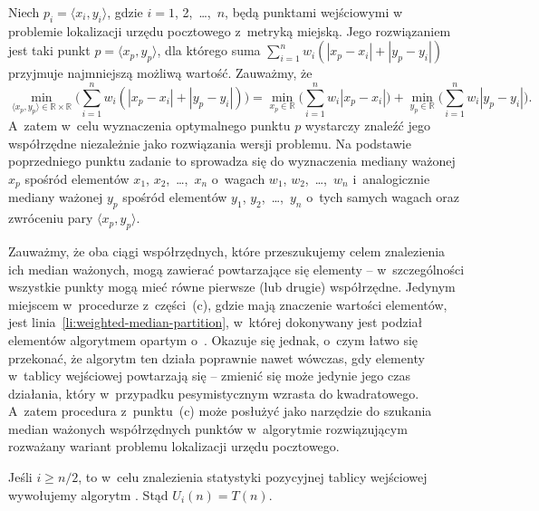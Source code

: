 \subproblem %
Niech $p_i=\langle x_i,y_i\rangle$, gdzie $i=1$, 2,~\dots,~$n$, będą punktami wejściowymi w~ problemie lokalizacji urzędu pocztowego z~metryką miejską. Jego rozwiązaniem jest taki punkt $p=\langle x_p,y_p\rangle$, dla którego suma $\sum_{i=1}^nw_i(|x_p-x_i|+|y_p-y_i|)$ przyjmuje najmniejszą możliwą wartość. Zauważmy, że
\[
    \min_{\langle x_p,y_p\rangle\in\mathbb{R}\times\mathbb{R}}\biggl(\sum_{i=1}^nw_i(|x_p-x_i|+|y_p-y_i|)\biggr) = \min_{x_p\in\mathbb{R}}\biggl(\sum_{i=1}^nw_i|x_p-x_i|\biggr)+\min_{y_p\in\mathbb{R}}\biggl(\sum_{i=1}^nw_i|y_p-y_i|\biggr).
\]
A~zatem w~celu wyznaczenia optymalnego punktu $p$ wystarczy znaleźć jego współrzędne niezależnie jako rozwiązania  wersji problemu. Na podstawie poprzedniego punktu zadanie to sprowadza się do wyznaczenia mediany ważonej $x_p$ spośród elementów $x_1$, $x_2$,~\dots,~$x_n$ o~wagach $w_1$, $w_2$,~\dots,~$w_n$ i~analogicznie mediany ważonej $y_p$ spośród elementów $y_1$, $y_2$,~\dots,~$y_n$ o~tych samych wagach oraz zwróceniu pary $\langle x_p,y_p\rangle$.

Zauważmy, że oba ciągi współrzędnych, które przeszukujemy celem znalezienia ich median ważonych, mogą zawierać powtarzające się elementy -- w~szczególności wszystkie punkty mogą mieć równe pierwsze (lub drugie) współrzędne. Jedynym miejscem w~procedurze  z~części~(c), gdzie mają znaczenie wartości elementów, jest linia~\ref{li:weighted-median-partition}, w~której dokonywany jest podział elementów algorytmem opartym o~. Okazuje się jednak, o~czym łatwo się przekonać, że algorytm ten działa poprawnie nawet wówczas, gdy elementy w~tablicy wejściowej powtarzają się -- zmienić się może jedynie jego czas działania, który w~przypadku pesymistycznym wzrasta do kwadratowego. A~zatem procedura z~punktu~(c) może posłużyć jako narzędzie do szukania median ważonych współrzędnych punktów w~algorytmie rozwiązującym rozważany wariant problemu lokalizacji urzędu pocztowego.


\subproblem %

\noindent Jeśli $i\ge n/2$, to w~celu znalezienia  statystyki pozycyjnej tablicy wejściowej wywołujemy algorytm . Stąd $U_i(n)=T(n)$.

